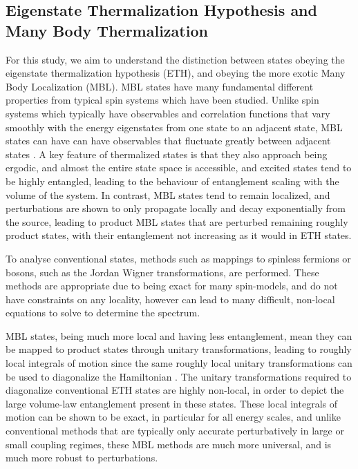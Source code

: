 \documentclass[12pt]{article}{}
\begin{document}
\subsection{Eigenstate Thermalization Hypothesis and Many Body Thermalization}
For this study, we aim to understand the distinction between states obeying the eigenstate thermalization hypothesis (ETH), and obeying the more exotic Many Body Localization (MBL). MBL\cite{Abanin2018} states have many fundamental different properties from typical spin systems which have been studied. Unlike spin systems which typically have observables and correlation functions that vary smoothly with the energy eigenstates from one state to an adjacent state, MBL states can have can have observables that fluctuate greatly between adjacent states \cite{Abanin2018}. A key feature of thermalized states is that they also approach being ergodic, and almost the entire state space is accessible, and excited states tend to be highly entangled, leading to the behaviour of entanglement scaling with the volume of the system. In contrast, MBL states tend to remain localized, and perturbations are shown to only propagate locally and decay exponentially from the source, leading to product MBL states that are perturbed remaining roughly product states, with their entanglement not increasing as it would in ETH states.

To analyse conventional states, methods such as mappings to spinless fermions or bosons, such as the Jordan Wigner transformations, are performed. These methods are appropriate due to being exact for many spin-models, and do not have constraints on any locality, however can lead to many difficult, non-local equations to solve to determine the spectrum.

MBL states, being much more local and having less entanglement, mean they can be mapped to product states through unitary transformations, leading to roughly local integrals of motion since the same roughly local unitary transformations can be used to diagonalize the Hamiltonian \cite{Abanin2018}. The unitary transformations required to diagonalize conventional ETH states are highly non-local, in order to depict the large volume-law entanglement present in these states. These local integrals of motion can be shown to be exact, in particular for all energy scales, and unlike conventional methods that are typically only accurate perturbatively in large or small coupling regimes, these MBL methods are much more universal, and is much more robust to perturbations.
\end{document}
